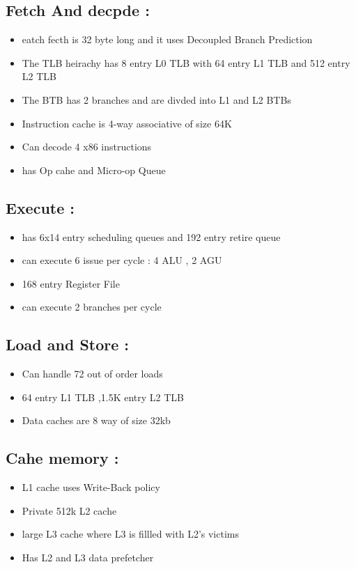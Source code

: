 \documentclass[a4paper,10pt]{article}
\begin{document}
\subsection{Fetch And decpde :}
\begin{itemize}
 \item eatch fecth is 32 byte long and it uses Decoupled Branch Prediction
 \item The TLB heirachy has 8 entry L0 TLB  with 64 entry L1 TLB and 512 entry L2 TLB
 \item The BTB has 2 branches and are divded into L1 and L2 BTBs
 \item Instruction cache is 4-way associative of size 64K
 \item Can decode 4 x86 instructions
 \item has Op cahe and Micro-op Queue  
 \end{itemize}

\subsection{Execute :}
\begin{itemize}
 \item has 6x14 entry scheduling queues and 192 entry retire queue
 \item can execute 6 issue per cycle : 4 ALU , 2 AGU
 \item 168 entry Register File 
 \item can execute 2 branches per cycle
\end{itemize}

\subsection{Load and Store :}
\begin{itemize}
 \item Can handle 72 out of order loads
 \item 64 entry L1 TLB ,1.5K entry L2 TLB
 \item Data caches are 8 way of size 32kb
\end{itemize}

\subsection{Cahe memory :}
\begin{itemize}
\item L1 cache uses Write-Back policy
 \item Private 512k L2 cache
 \item large L3 cache where L3 is fillled with L2's victims
 \item Has L2 and L3 data prefetcher
\end{itemize}
\end{document}
